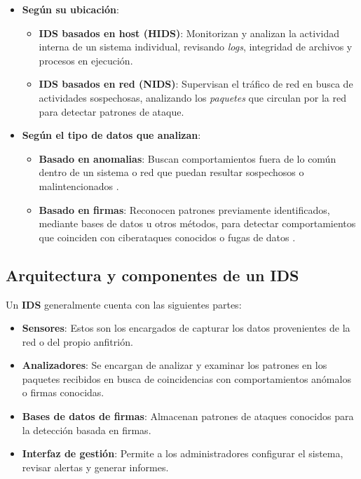 \documentclass[11pt,a4paper,twoside]{report}
\begin{document}
\begin{itemize}
	\item \textbf{Según su ubicación}:
	\begin{itemize}
		\item \textbf{IDS basados en host (HIDS)}: Monitorizan y analizan la actividad interna de un sistema individual, revisando \textit{logs}, integridad de archivos y procesos en ejecución.
		
		\item \textbf{IDS basados en red (NIDS)}: Supervisan el tráfico de red en busca de actividades sospechosas, analizando los \textit{paquetes} que circulan por la red para detectar patrones de ataque.
	\end{itemize}
	
	\item \textbf{Según el tipo de datos que analizan}:
	\begin{itemize}
		\item \textbf{Basado en anomalias}: Buscan comportamientos fuera de lo común dentro de un sistema o red que puedan resultar sospechosos o malintencionados \cite{garcia2009anomaly}.
		
		\item \textbf{Basado en firmas}: Reconocen patrones previamente identificados, mediante bases de datos u otros métodos, para detectar comportamientos que coinciden con ciberataques conocidos o fugas de datos \cite{detection2005signature}.
	\end{itemize}
\end{itemize}


\subsection{Arquitectura y componentes de un IDS}

Un \textbf{IDS} generalmente cuenta con las siguientes partes:

\begin{itemize}
	\item \textbf{Sensores}: Estos son los encargados de capturar los datos provenientes de la red o del propio anfitrión.
	
	\item \textbf{Analizadores}: Se encargan de analizar y examinar los patrones en los paquetes recibidos en busca de coincidencias con comportamientos anómalos o firmas conocidas.
	
	\item \textbf{Bases de datos de firmas}: Almacenan patrones de ataques conocidos para la detección basada en firmas.
	
	\item \textbf{Interfaz de gestión}: Permite a los administradores configurar el sistema, revisar alertas y generar informes.
\end{itemize}
\end{document}
